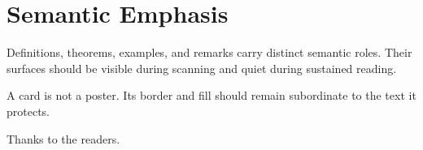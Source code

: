 \documentclass[11pt,twoside]{scrbook}
\begin{document}
\chapter{Semantic Emphasis}
Definitions, theorems, examples, and remarks carry distinct semantic roles.
Their surfaces should be visible during scanning and quiet during sustained
reading.
\begin{synremark}
  A card is not a poster. Its border and fill should remain subordinate to the
  text it protects.
\end{synremark}
\SynapticBackMatter
\SynapticAcknowledgments
Thanks to the readers.
\end{document}
